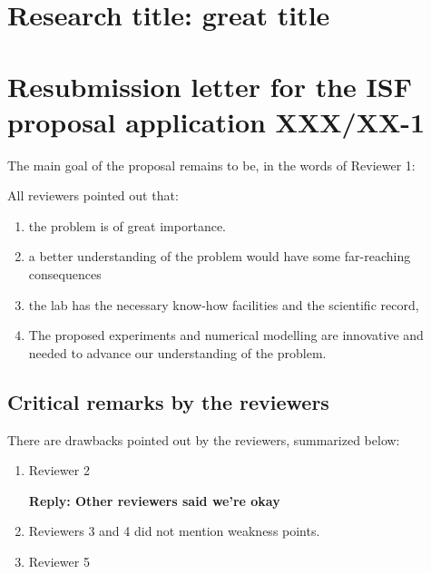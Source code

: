 \documentclass[11pt]{article}
\begin{document}

\section*{Research title: great title }
\setcounter{section}{0}
\setcounter{subsection}{0}

\section*{Resubmission letter for the ISF proposal application XXX/XX-1}



The main goal of the proposal remains to be, in the words of Reviewer 1: 

\medskip

All reviewers pointed out that:
\begin{enumerate}
	\item the problem is of great importance. 
	
	\item a better understanding of the problem would have some far-reaching consequences 
	
	\item the lab has the necessary know-how facilities and the scientific record, 
	
	\item The proposed experiments and numerical modelling are innovative and needed to advance our understanding of the problem. 
\end{enumerate}

\subsection*{Critical remarks by the reviewers}
There are drawbacks pointed out by the reviewers, summarized below: 


\begin{enumerate}
\item Reviewer 2

  \textbf{Reply: Other reviewers said we're okay} 

\item Reviewers 3 and 4 did not mention weakness points. 

\item Reviewer 5

%
\end{enumerate}

\vspace{-10pt}
\singlespacing
\printbibliography
\end{document}
